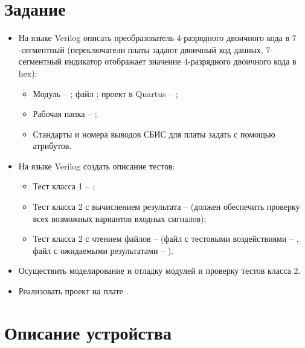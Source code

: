 





\tableofcontents
\lstlistoflistings
\listoffigures
\newpage

\section{Задание}

\begin{itemize}
	\item На языке Verilog описать преобразователь $4$-разрядного двоичного кода в $7$-сегментный (переключатели платы  задают двоичный код данных, 7-сегментный индикатор отображает значение 4-разрядного двоичного кода в hex):
		\begin{itemize}
			\item Модуль -- ; файл ; проект в Quartus -- ;
			\item Рабочая папка -- ;
			\item Стандарты и номера выводов СБИС для платы  задать с помощью атрибутов.
		\end{itemize}
	
	\item На языке Verilog создать описание тестов:
		\begin{itemize}
			\item Тест класса 1 -- ;
			\item Тест класса 2 с вычислением результата --  (должен обеспечить проверку всех возможных вариантов входных сигналов);
			\item Тест класса 2 с чтением файлов --  (файл с тестовыми воздействиями -- , файл с ожидаемыми результатами -- ).
		\end{itemize}
	
	\item Осуществить моделирование и отладку модулей и проверку тестов класса 2.
	
	\item Реализовать проект на плате .
\end{itemize}

\section{Описание устройства}

